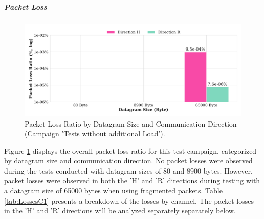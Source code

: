 \subparagraph{Packet Loss}

\begin{figure}[h!]
    \centering
    \includegraphics[width=1\linewidth]{figures/reliability/ihawk/diagr3.pdf}
    \caption{Packet Loss Ratio by Datagram Size and Communication Direction (Campaign 'Tests without additional Load').}
    \label{fig:diagr3Loss}
\end{figure}

Figure \ref{fig:diagr3Loss} displays the overall packet loss ratio for this test campaign, categorized by datagram size and communication direction. No packet losses were observed during the tests conducted with datagram sizes of 80 and 8900 bytes. However, packet losses were observed in both the 'H' and 'R' directions during testing with a datagram size of 65000 bytes when using fragmented packets. Table \ref{tab:LossesC1} presents a breakdown of the losses by channel. The packet losses in the 'H' and 'R' directions will be analyzed separately separately below.

